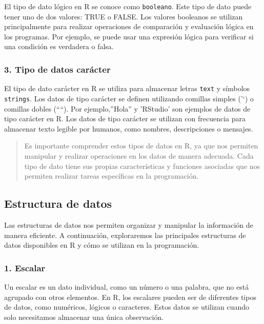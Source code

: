 \documentclass[
  letterpaper,
  DIV=11,
  numbers=noendperiod]{scrartcl}
\begin{document}
El tipo de dato lógico en R se conoce como \texttt{booleano}. Este tipo
de dato puede tener uno de dos valores: TRUE o FALSE. Los valores
booleanos se utilizan principalmente para realizar operaciones de
comparación y evaluación lógica en los programas. Por ejemplo, se puede
usar una expresión lógica para verificar si una condición es verdadera o
falsa.

\hypertarget{tipo-de-datos-caruxe1cter}{%
\subsubsection{3. Tipo de datos
carácter}\label{tipo-de-datos-caruxe1cter}}

El tipo de dato carácter en R se utiliza para almacenar letras
\texttt{text} y símbolos \texttt{strings}. Los datos de tipo carácter se
definen utilizando comillas simples ('`) o comillas dobles (````). Por
ejemplo,''Hola'' y 'RStudio' son ejemplos de datos de tipo carácter en
R. Los datos de tipo carácter se utilizan con frecuencia para almacenar
texto legible por humanos, como nombres, descripciones o mensajes.

\begin{quote}
Es importante comprender estos tipos de datos en R, ya que nos permiten
manipular y realizar operaciones en los datos de manera adecuada. Cada
tipo de dato tiene sus propias características y funciones asociadas que
nos permiten realizar tareas específicas en la programación.
\end{quote}

\hypertarget{estructura-de-datos}{%
\subsection{Estructura de datos}\label{estructura-de-datos}}

Las estructuras de datos nos permiten organizar y manipular la
información de manera eficiente. A continuación, exploraremos las
principales estructuras de datos disponibles en R y cómo se utilizan en
la programación.

\hypertarget{escalar}{%
\subsubsection{1. Escalar}\label{escalar}}

Un escalar es un dato individual, como un número o una palabra, que no
está agrupado con otros elementos. En R, los escalares pueden ser de
diferentes tipos de datos, como numéricos, lógicos o caracteres. Estos
datos se utilizan cuando solo necesitamos almacenar una única
observación.
\end{document}
